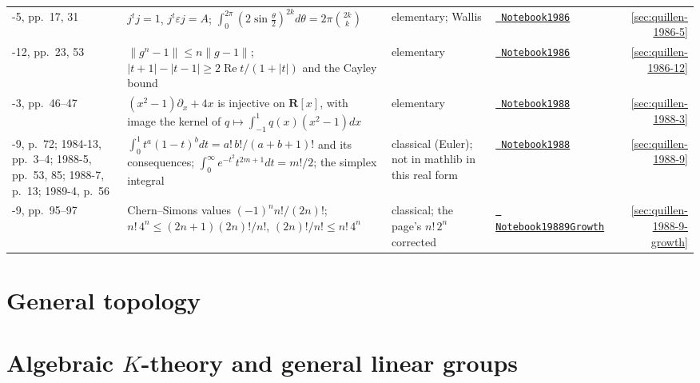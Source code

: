 \documentclass[11pt]{article}
\newcommand{\leanblobmain}{https://github.com/Commutator-IO/grothendieck-project/blob/main/lean/Quillen}
\theoremstyle{plain}
\theoremstyle{definition}
\theoremstyle{remark}
\renewcommand{\_}{\bkunderscore\allowbreak}
\let\origtexttt\texttt
\renewcommand{\texttt}[1]{\origtexttt{\XeTeXinterchartokenstate=1 #1}}
\begin{document}
\begin{center}
{\begin{longtable}{@{}>{\raggedright\arraybackslash}p{1.6cm}>{\raggedright\arraybackslash}p{5.6cm}>{\raggedright\arraybackslash}p{3.9cm}>{\raggedright\arraybackslash}p{2.6cm}r@{}}
1986-5, pp.~17, 31 & $j^tj = 1$, $j^t\varepsilon j = A$; $\int_0^{2\pi}(2\sin\frac\theta2)^{2k}d\theta = 2\pi\binom{2k}k$ & elementary; Wallis & \href{\leanblobmain/Notebook1986_5.lean}{\texttt{Notebook1986\_5}} & \ref{sec:quillen-1986-5}\\
1986-12, pp.~23, 53 & $\|g^n - 1\| \le n\|g - 1\|$; $|t + 1| - |t - 1| \ge 2\operatorname{Re}t/(1 + |t|)$ and the Cayley bound & elementary & \href{\leanblobmain/Notebook1986_12.lean}{\texttt{Notebook1986\_12}} & \ref{sec:quillen-1986-12}\\
1988-3, pp.~46--47 & $(x^2 - 1)\partial_x + 4x$ is injective on $\mathbf R[x]$, with image the kernel of $q \mapsto \int_{-1}^1q(x)(x^2 - 1)dx$ & elementary & \href{\leanblobmain/Notebook1988_3.lean}{\texttt{Notebook1988\_3}} & \ref{sec:quillen-1988-3}\\
1988-9, p.~72; 1984-13, pp.~3--4; 1988-5, pp.~53, 85; 1988-7, p.~13; 1989-4, p.~56 & $\int_0^1t^a(1 - t)^bdt = a!\,b!/(a + b + 1)!$ and its consequences; $\int_0^\infty e^{-t^2}t^{2m+1}dt = m!/2$; the simplex integral & classical (Euler); not in mathlib in this real form & \href{\leanblobmain/Notebook1988_9.lean}{\texttt{Notebook1988\_9}} & \ref{sec:quillen-1988-9}\\
1988-9, pp.~95--97 & Chern--Simons values $(-1)^nn!/(2n)!$; $n!\,4^n \le (2n + 1)(2n)!/n!$, $(2n)!/n! \le n!\,4^n$ & classical; the page's $n!\,2^n$ corrected & \href{\leanblobmain/Notebook1988_9Growth.lean}{\texttt{Notebook1988\_9Growth}} & \ref{sec:quillen-1988-9-growth}\\
\bottomrule
\end{longtable}}
\end{center}

\part{General topology}



\part{Algebraic $K$-theory and general linear groups}













\end{document}

